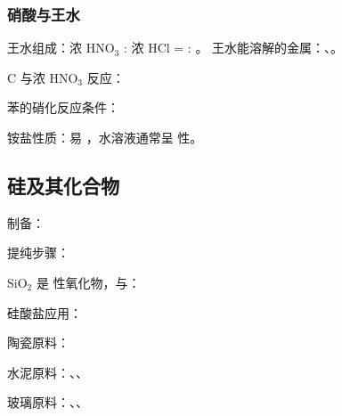 \subsubsection{硝酸与王水}
王水组成：浓 HNO$_3$ : 浓 HCl = \sbl : \sbl 。
王水能溶解的金属：\sbl 、\sbl 。

C 与浓 HNO$_3$ 反应：


苯的硝化反应条件：


铵盐性质：易 \sbl ，水溶液通常呈 \sbl 性。

\subsection{硅及其化合物}

制备：

提纯步骤：

SiO$_2$ 是 \sbl 性氧化物，与：



硅酸盐应用：

陶瓷原料：\sbl

水泥原料：\sbl 、\sbl 、\sbl

玻璃原料：\sbl 、\sbl 、\sbl